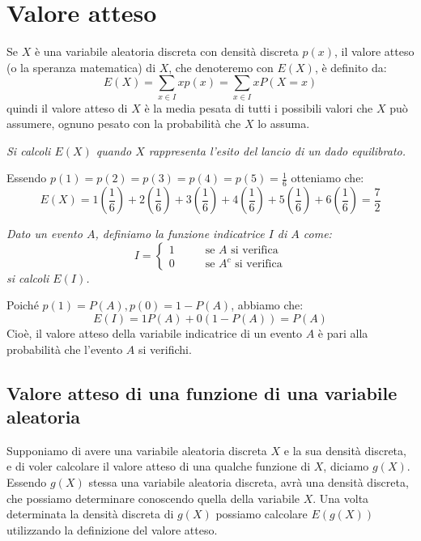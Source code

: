 \section{Valore atteso}
Se $X$ è una variabile aleatoria discreta con densità discreta $p(x)$, il valore atteso (o la speranza matematica) di $X$, che denoteremo con $E(X)$, è definito da:
\begin{equation*}
    E(X)=\sum_{x\in I}xp(x)=\sum_{x\in I}xP(X=x)
\end{equation*}
quindi il valore atteso di $X$ è la media pesata di tutti i possibili valori che $X$ può assumere, ognuno pesato con la probabilità che $X$ lo assuma.

\begin{Example}{}{}
    \textit{Si calcoli $E(X)$ quando $X$ rappresenta l’esito del lancio di un dado equilibrato.}
    
    Essendo $p(1) = p(2) = p(3) = p(4) = p(5) = \frac{1}{6}$ otteniamo che:
    \begin{equation*}
        E(X)=1(\frac{1}{6})+2(\frac{1}{6})+3(\frac{1}{6})+4(\frac{1}{6})+5(\frac{1}{6})+6(\frac{1}{6})=\frac{7}{2}
    \end{equation*}
\end{Example}

\begin{Example}{}{}
    \textit{Dato un evento $A$, definiamo la funzione indicatrice $I$ di $A$ come:}
    \begin{equation*}
        I=\begin{cases}
            1\hspace{1cm}\mbox{ se }A\mbox{ si verifica}\\
            0\hspace{1cm}\mbox{ se }A^c\mbox{ si verifica}
        \end{cases}
    \end{equation*}
    \textit{si calcoli $E(I)$.}

    Poiché $p(1) = P(A), p(0) = 1 - P(A)$, abbiamo che:
    \begin{equation*}
        E(I)=1P(A)+0(1-P(A))=P(A)
    \end{equation*}
    Cioè, il valore atteso della variabile indicatrice di un evento $A$ è pari alla probabilità che l'evento $A$ si verifichi. 
\end{Example}

\subsection*{Valore atteso di una funzione di una variabile aleatoria}
Supponiamo di avere una variabile aleatoria discreta $X$ e la sua densità discreta, e di voler calcolare il valore atteso di una qualche funzione di $X$, diciamo $g(X)$. Essendo $g(X)$ stessa una variabile aleatoria discreta, avrà una densità discreta, che possiamo determinare conoscendo quella della variabile $X$. Una volta determinata la densità discreta di $g(X)$ possiamo calcolare $E(g(X))$ utilizzando la definizione del valore atteso.

